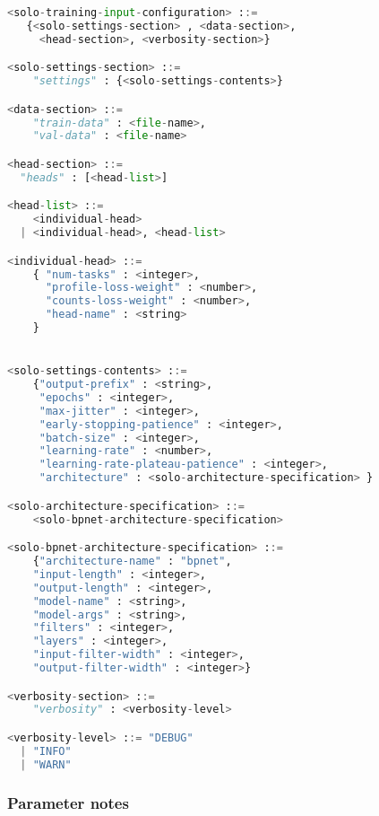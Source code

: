 \documentclass{article}
\begin{document}
\begin{lstlisting}[language=python]
<solo-training-input-configuration> ::= 
   {<solo-settings-section> , <data-section>, 
     <head-section>, <verbosity-section>}

<solo-settings-section> ::= 
    "settings" : {<solo-settings-contents>}

<data-section> ::= 
    "train-data" : <file-name>,
    "val-data" : <file-name>

<head-section> ::= 
  "heads" : [<head-list>]

<head-list> ::= 
    <individual-head>
  | <individual-head>, <head-list>

<individual-head> ::=
    { "num-tasks" : <integer>,
      "profile-loss-weight" : <number>,
      "counts-loss-weight" : <number>,
      "head-name" : <string>
    }


<solo-settings-contents> ::= 
    {"output-prefix" : <string>, 
     "epochs" : <integer>, 
     "max-jitter" : <integer>,
     "early-stopping-patience" : <integer>, 
     "batch-size" : <integer>, 
     "learning-rate" : <number>, 
     "learning-rate-plateau-patience" : <integer>,
     "architecture" : <solo-architecture-specification> } 

<solo-architecture-specification> ::= 
    <solo-bpnet-architecture-specification>

<solo-bpnet-architecture-specification> ::= 
    {"architecture-name" : "bpnet",
    "input-length" : <integer>, 
    "output-length" : <integer>,
    "model-name" : <string>,
    "model-args" : <string>,
    "filters" : <integer>,
    "layers" : <integer>,
    "input-filter-width" : <integer>,
    "output-filter-width" : <integer>}

<verbosity-section> ::= 
    "verbosity" : <verbosity-level>

<verbosity-level> ::= "DEBUG"
  | "INFO"
  | "WARN"
\end{lstlisting}

\subsubsection{Parameter notes}
\end{document}
